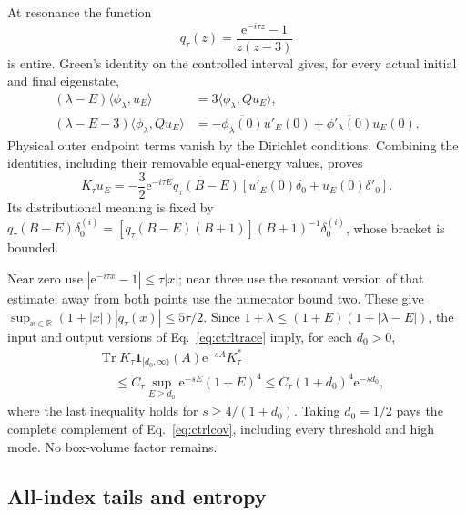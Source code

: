 \documentclass[aps,pra,reprint,superscriptaddress,longbibliography]{revtex4-2}
\newcommand{\Tr}{\operatorname{Tr}}
\newcommand{\ee}{\mathrm e}
\newcommand{\ip}[2]{\langle#1,#2\rangle}
\newcommand{\one}{\mathbf 1}
\begin{document}
At resonance the function
\begin{equation}
 q_\tau(z)=\frac{\ee^{-i\tau z}-1}{z(z-3)}                \label{eq:ctrlq}
\end{equation}
is entire. Green's identity on the controlled interval gives, for
every actual initial and final eigenstate,
\begin{align}
 (\lambda-E)\ip{\phi_\lambda}{u_E}
 &=3\ip{\phi_\lambda}{Qu_E},\nonumber\\
 (\lambda-E-3)\ip{\phi_\lambda}{Qu_E}
 &=-\overline{\phi_\lambda(0)}u'_E(0)
              +\overline{\phi'_\lambda(0)}u_E(0).
                                                        \label{eq:ctrlgreen}
\end{align}
Physical outer endpoint terms vanish by the Dirichlet conditions.
Combining the identities, including their removable equal-energy
values, proves
\begin{equation}
 K_\tau u_E=-\frac32\ee^{-i\tau E}q_\tau(B-E)
                    [u'_E(0)\delta_0+u_E(0)\delta'_0].
                                                        \label{eq:ctrlboundary}
\end{equation}
Its distributional meaning is fixed by
$q_\tau(B-E)\delta_0^{(i)}=[q_\tau(B-E)(B+1)]
(B+1)^{-1}\delta_0^{(i)}$, whose bracket is bounded.

Near zero use $|\ee^{-i\tau x}-1|\le\tau|x|$; near three use
the resonant version of that estimate; away from both points use
the numerator bound two. These give
$\sup_{x\in\mathbb R}(1+|x|)|q_\tau(x)|\le5\tau/2$.
Since $1+\lambda\le(1+E)(1+|\lambda-E|)$, the input and output
versions of Eq.~\eqref{eq:ctrltrace} imply, for each $d_0>0$,
\begin{align}
 &\Tr K_\tau\one_{[d_0,\infty)}(A)\ee^{-sA}K_\tau^*
 \nonumber\\[-2pt]
 &\hspace{15pt}\le C_\tau\sup_{E\ge d_0}\ee^{-sE}(1+E)^4
 \le C_\tau(1+d_0)^4\ee^{-sd_0},                         \label{eq:ctrlhightrace}
\end{align}
where the last inequality holds for $s\ge4/(1+d_0)$.
Taking $d_0=1/2$ pays the complete complement of
Eq.~\eqref{eq:ctrlcov}, including every threshold and high mode.
No box-volume factor remains.

\subsection{All-index tails and entropy}
\end{document}

